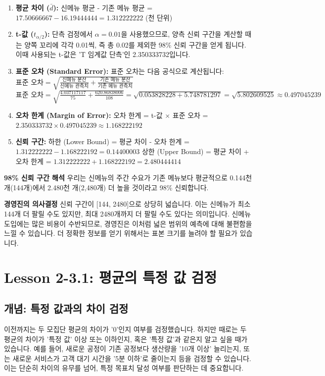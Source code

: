 \documentclass[11pt,a4paper]{article}
\begin{document}
\begin{enumerate}
    \item \textbf{평균 차이 ($\bar{d}$):}
    신메뉴 평균 - 기존 메뉴 평균 = $17.50666667 - 16.19444444 = 1.312222222$ (천 단위)
    \item \textbf{t-값 ($t_{\alpha/2}$):}
    단측 검정에서 $\alpha = 0.01$을 사용했으므로, 양측 신뢰 구간을 계산할 때는 양쪽 꼬리에 각각 0.01씩, 즉 총 0.02를 제외한 98\% 신뢰 구간을 얻게 됩니다. 이때 사용되는 t-값은 'T 임계값 단측'인 2.350333732입니다.
    \item \textbf{표준 오차 (Standard Error):}
    표준 오차는 다음 공식으로 계산됩니다:
    $\text{표준 오차} = \sqrt{\frac{\text{신메뉴 분산}}{\text{신메뉴 관측치}} + \frac{\text{기존 메뉴 분산}}{\text{기존 메뉴 관측치}}}$
    $\text{표준 오차} = \sqrt{\frac{4.037117117}{75} + \frac{620.86838006}{108}} = \sqrt{0.053828228 + 5.748781297} = \sqrt{5.802609525} \approx 0.497045239$
    \item \textbf{오차 한계 (Margin of Error):}
    오차 한계 = t-값 $\times$ 표준 오차 = $2.350333732 \times 0.497045239 \approx 1.168222192$
    \item \textbf{신뢰 구간:}
    하한 (Lower Bound) = 평균 차이 - 오차 한계 = $1.312222222 - 1.168222192 = 0.14400003$
    상한 (Upper Bound) = 평균 차이 + 오차 한계 = $1.312222222 + 1.168222192 = 2.480444414$
\end{enumerate}

\begin{summarybox}
\textbf{98\% 신뢰 구간 해석}
우리는 신메뉴의 주간 수요가 기존 메뉴보다 평균적으로 0.144천 개(144개)에서 2.480천 개(2,480개) 더 높을 것이라고 98\% 신뢰합니다.
\end{summarybox}

\begin{warningbox}
\textbf{경영진의 의사결정}
신뢰 구간이 [144, 2480]으로 상당히 넓습니다. 이는 신메뉴가 최소 144개 더 팔릴 수도 있지만, 최대 2480개까지 더 팔릴 수도 있다는 의미입니다. 신메뉴 도입에는 많은 비용이 수반되므로, 경영진은 이처럼 넓은 범위의 예측에 대해 불편함을 느낄 수 있습니다. 더 정확한 정보를 얻기 위해서는 표본 크기를 늘려야 할 필요가 있습니다.
\end{warningbox}

\newpage
\section*{Lesson 2-3.1: 평균의 특정 값 검정}

\subsection*{개념: 특정 값과의 차이 검정}
이전까지는 두 모집단 평균의 차이가 '0'인지 여부를 검정했습니다. 하지만 때로는 두 평균의 차이가 '특정 값' 이상 또는 이하인지, 혹은 '특정 값'과 같은지 알고 싶을 때가 있습니다. 예를 들어, 새로운 공정이 기존 공정보다 생산량을 '10개 이상' 늘리는지, 또는 새로운 서비스가 고객 대기 시간을 '5분 이하'로 줄이는지 등을 검정할 수 있습니다. 이는 단순히 차이의 유무를 넘어, 특정 목표치 달성 여부를 판단하는 데 중요합니다.
\end{document}
